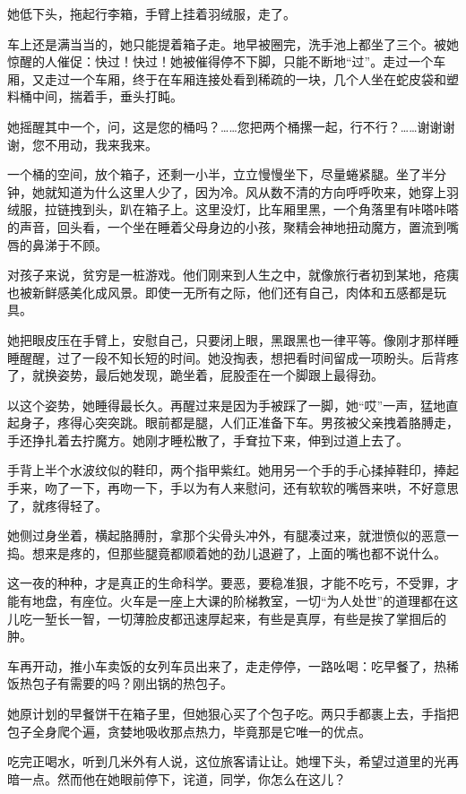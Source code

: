 \documentclass[lang=cn,newtx,12pt,scheme=chinese]{elegantbook}
\begin{document}
她低下头，拖起行李箱，手臂上挂着羽绒服，走了。

车上还是满当当的，她只能提着箱子走。地早被圈完，洗手池上都坐了三个。被她惊醒的人催促：快过！快过！她被催得停不下脚，只能不断地“过”。走过一个车厢，又走过一个车厢，终于在车厢连接处看到稀疏的一块，几个人坐在蛇皮袋和塑料桶中间，揣着手，垂头打盹。

她摇醒其中一个，问，这是您的桶吗？……您把两个桶摞一起，行不行？……谢谢谢谢，您不用动，我来我来。

一个桶的空间，放个箱子，还剩一小半，立立慢慢坐下，尽量蜷紧腿。坐了半分钟，她就知道为什么这里人少了，因为冷。风从数不清的方向呼呼吹来，她穿上羽绒服，拉链拽到头，趴在箱子上。这里没灯，比车厢里黑，一个角落里有咔嗒咔嗒的声音，回头看，一个坐在睡着父母身边的小孩，聚精会神地扭动魔方，置流到嘴唇的鼻涕于不顾。

对孩子来说，贫穷是一桩游戏。他们刚来到人生之中，就像旅行者初到某地，疮痍也被新鲜感美化成风景。即使一无所有之际，他们还有自己，肉体和五感都是玩具。

她把眼皮压在手臂上，安慰自己，只要闭上眼，黑跟黑也一律平等。像刚才那样睡睡醒醒，过了一段不知长短的时间。她没掏表，想把看时间留成一项盼头。后背疼了，就换姿势，最后她发现，跪坐着，屁股歪在一个脚跟上最得劲。

以这个姿势，她睡得最长久。再醒过来是因为手被踩了一脚，她“哎”一声，猛地直起身子，疼得心突突跳。眼前都是腿，人们正准备下车。男孩被父亲拽着胳膊走，手还挣扎着去拧魔方。她刚才睡松散了，手耷拉下来，伸到过道上去了。

手背上半个水波纹似的鞋印，两个指甲紫红。她用另一个手的手心揉掉鞋印，捧起手来，吻了一下，再吻一下，手以为有人来慰问，还有软软的嘴唇来哄，不好意思了，就疼得轻了。

她侧过身坐着，横起胳膊肘，拿那个尖骨头冲外，有腿凑过来，就泄愤似的恶意一捣。想来是疼的，但那些腿竟都顺着她的劲儿退避了，上面的嘴也都不说什么。

这一夜的种种，才是真正的生命科学。要恶，要稳准狠，才能不吃亏，不受罪，才能有地盘，有座位。火车是一座上大课的阶梯教室，一切“为人处世”的道理都在这儿吃一堑长一智，一切薄脸皮都迅速厚起来，有些是真厚，有些是挨了掌掴后的肿。

车再开动，推小车卖饭的女列车员出来了，走走停停，一路吆喝：吃早餐了，热稀饭热包子有需要的吗？刚出锅的热包子。

她原计划的早餐饼干在箱子里，但她狠心买了个包子吃。两只手都裹上去，手指把包子全身爬个遍，贪婪地吸收那点热力，毕竟那是它唯一的优点。

吃完正喝水，听到几米外有人说，这位旅客请让让。她埋下头，希望过道里的光再暗一点。然而他在她眼前停下，诧道，同学，你怎么在这儿？
\end{document}
